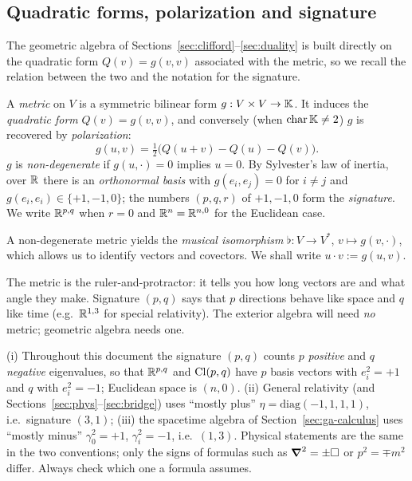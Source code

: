 \subsection{Quadratic forms, polarization and signature}\label{sec:quadform}
The geometric algebra of Sections~\ref{sec:clifford}--\ref{sec:duality} is built directly on the quadratic form $Q(v)=g(v,v)$
associated with the metric, so we recall the relation between the two and the notation for the signature.
\begin{definition}
A \emph{metric} on $V$ is a symmetric bilinear form $g:V\times V\to\mathbb{K}$. It induces the
\emph{quadratic form} $Q(v)=g(v,v)$, and conversely (when $\mathrm{char}\,\mathbb{K}\neq2$) $g$ is
recovered by \emph{polarization}:
\begin{equation}\label{eq:polar}
  g(u,v)=\tfrac12\bigl(Q(u+v)-Q(u)-Q(v)\bigr).
\end{equation}
$g$ is \emph{non-degenerate} if $g(u,\cdot)=0$ implies $u=0$. By Sylvester's law of inertia, over
$\mathbb{R}$ there is an \emph{orthonormal basis} with $g(e_i,e_j)=0$ for $i\neq j$ and
$g(e_i,e_i)\in\{+1,-1,0\}$; the numbers $(p,q,r)$ of $+1,-1,0$ form the \emph{signature}.
We write $\mathbb{R}^{p,q}$ when $r=0$ and $\mathbb{R}^n=\mathbb{R}^{n,0}$ for the Euclidean case.
\end{definition}

A non-degenerate metric yields the \emph{musical isomorphism} $\flat:V\to V^*$,
$v\mapsto g(v,\cdot)$, which allows us to identify vectors and covectors.
We shall write $u\cdot v:=g(u,v)$.

\begin{intuition}
The metric is the ruler-and-protractor: it tells you how long vectors are and what angle they make.
Signature $(p,q)$ says that $p$ directions behave like space and $q$ like time (e.g.\ $\mathbb{R}^{1,3}$ for
special relativity). The exterior algebra will need \emph{no} metric; geometric algebra needs one.
\end{intuition}


\begin{pitfall}
(i) Throughout this document the signature $(p,q)$ counts $p$ \emph{positive} and $q$ \emph{negative} eigenvalues,
so that $\mathbb{R}^{p,q}$ and $\mathrm{Cl}(p,q)$ have $p$ basis vectors with $e_i^2=+1$ and $q$ with $e_i^2=-1$; Euclidean space is $(n,0)$.
(ii) General relativity (and Sections~\ref{sec:phys}--\ref{sec:bridge}) uses ``mostly plus'' $\eta=\mathrm{diag}(-1,1,1,1)$, i.e.\ signature
$(3,1)$; (iii) the spacetime algebra of Section~\ref{sec:ga-calculus} uses ``mostly minus'' $\gamma_0^2=+1$, $\gamma_i^2=-1$, i.e.\ $(1,3)$.
Physical statements are the same in the two conventions; only the signs of formulas such as $\boldsymbol{\nabla}^2=\pm\Box$ or
$p^2=\mp m^2$ differ. Always check which one a formula assumes.
\end{pitfall}
